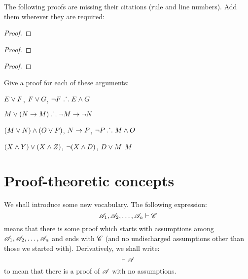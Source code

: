 \practiceproblems
\solutions
\problempart
\label{pr.justifyTFLproof}
The following proofs are missing their citations (rule and line numbers). Add them wherever they are required:
\begin{multicols}{2}
\begin{proof}
 {}
 {}
\end{proof}
\vfill
\begin{proof}
\open
\close
{}
\end{proof}
\columnbreak
\begin{proof}
\open
	 {}
		\open
	\close
\close
{}
\end{proof}
\end{multicols}

\problempart 
Give a proof for each of these arguments:
\begin{earg}
\item $E\vee F$, $F\vee G$, $\neg F \mathrel{\ldotp\dot{}\,\ldotp} E \wedge G$
\item $M\vee(N\rightarrow M) \mathrel{\ldotp\dot{}\,\ldotp} \neg M \rightarrow \neg N$
\item $(M \vee N) \wedge (O \vee P)$, $N \rightarrow P$, $\neg P \mathrel{\ldotp\dot{}\,\ldotp} M\wedge O$
\item $(X\wedge Y)\vee(X\wedge Z)$, $\neg(X\wedge D)$, $D\vee M$ \therefore $M$
\end{earg}



\chapter{Proof-theoretic concepts}\label{s:ProofTheoreticConcepts}

We shall introduce some new vocabulary. The following expression:
$$\mathscr{A}_1, \mathscr{A}_2, \ldots, \mathscr{A}_n \vdash \mathscr{C}$$
means that there is some proof which starts with assumptions among $\mathscr{A}_1, \mathscr{A}_2, \ldots, \mathscr{A}_n$ and ends with $\mathscr{C}$ (and no undischarged assumptions other than those we started with). Derivatively, we shall write:
$$\vdash \mathscr{A}$$
to mean that there is a proof of $\mathscr{A}$ with no assumptions. 


